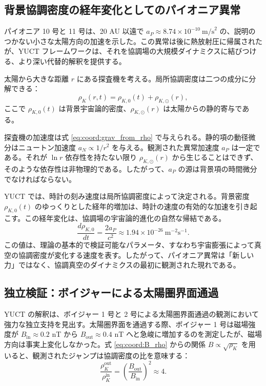 \documentclass[11pt,a4paper]{article}
\theoremstyle{remark}
\begin{document}
	\subsection{背景協調密度の経年変化としてのパイオニア異常}
	\label{subsec:coord:pioneer}
	
	パイオニア 10 号と 11 号は、20 AU 以遠で $a_P \approx 8.74 \times 10^{-10}\ \text{m/s}^2$ の、説明のつかない小さな太陽方向の加速を示した。この異常は後に熱放射圧に帰属されたが、YUCT フレームワークは、それを協調場の大規模ダイナミクスに結びつける、より深い代替的解釈を提供する。
	
	太陽から大きな距離 $r$ にある探査機を考える。局所協調密度は二つの成分に分解できる：
	\begin{equation}
		\rho_K(r,t) = \rho_{K,0}(t) + \rho_{K,\odot}(r),
		\label{eq:coord:rho_decomp}
	\end{equation}
	ここで $\rho_{K,0}(t)$ は背景宇宙論的密度、$\rho_{K,\odot}(r)$ は太陽からの静的寄与である。
	
	探査機の加速度は式 \eqref{eq:coord:grav_from_rho} で与えられる。静的項の動径微分はニュートン加速度 $a_N \propto 1/r^2$ を与える。観測された異常加速度 $a_P$ は一定である。それが $\ln r$ 依存性を持たない限り $\rho_{K,\odot}(r)$ から生じることはできず、そのような依存性は非物理的である。したがって、$a_P$ の源は背景項の時間微分でなければならない。
	
	YUCT では、時計の刻み速度は局所協調密度によって決定される。背景密度 $\rho_{K,0}(t)$ のゆっくりとした経年的増加は、時計の速度の有効的な加速を引き起こす。この経年変化は、協調場の宇宙論的進化の自然な帰結である。
	\begin{equation}
		\frac{d\rho_{K,0}}{dt} = \frac{2a_P}{c^2} \approx 1.94 \times 10^{-26}\ \text{m}^{-2}\text{s}^{-1}.
		\label{eq:coord:rho_dot}
	\end{equation}
	この値は、理論の基本的で検証可能なパラメータ、すなわち宇宙膨張によって真空の協調密度が変化する速度を表す。したがって、パイオニア異常は「新しい力」ではなく、協調真空のダイナミクスの最初に観測された現れである。
	
	\subsection{独立検証：ボイジャーによる太陽圏界面通過}
	\label{subsec:coord:voyager}
	
	YUCT の解釈は、ボイジャー 1 号と 2 号による太陽圏界面通過の観測において強力な独立支持を見出す。太陽圏界面を通過する際、ボイジャー 1 号は磁場強度が $B_{\text{in}} \approx 0.2$ nT から $B_{\text{out}} \approx 0.4$ nT へと急峻に増加するのを測定したが、磁場方向は事実上変化しなかった。式 \eqref{eq:coord:B_rho} からの関係 $B \propto \sqrt{\rho_K}$ を用いると、観測されたジャンプは協調密度の比を意味する：
	\begin{equation}
		\frac{\rho_K^{\text{out}}}{\rho_K^{\text{in}}} = \left( \frac{B_{\text{out}}}{B_{\text{in}}} \right)^2 \approx 4.
		\label{eq:coord:rho_ratio_voyager}
	\end{equation}
	
\end{document}
